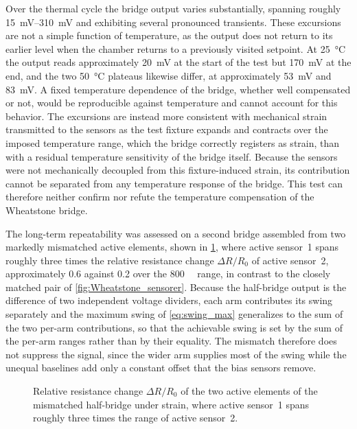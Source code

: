 Over the thermal cycle the bridge output varies substantially, spanning roughly \SIrange{15}{310}{\milli\volt} and exhibiting several pronounced transients. These excursions are not a simple function of temperature, as the output does not return to its earlier level when the chamber returns to a previously visited setpoint. At \SI{25}{\celsius} the output reads approximately \SI{20}{\milli\volt} at the start of the test but \SI{170}{\milli\volt} at the end, and the two \SI{50}{\celsius} plateaus likewise differ, at approximately \SI{53}{\milli\volt} and \SI{83}{\milli\volt}. A fixed temperature dependence of the bridge, whether well compensated or not, would be reproducible against temperature and cannot account for this behavior. The excursions are instead more consistent with mechanical strain transmitted to the sensors as the test fixture expands and contracts over the imposed temperature range, which the bridge correctly registers as strain, than with a residual temperature sensitivity of the bridge itself. Because the sensors were not mechanically decoupled from this fixture-induced strain, its contribution cannot be separated from any temperature response of the bridge. This test can therefore neither confirm nor refute the temperature compensation of the Wheatstone bridge.

The long-term repeatability was assessed on a second bridge assembled from two markedly mismatched active elements, shown in \cref{fig:finalWheatstoneSensorer}, where active sensor~1 spans roughly three times the relative resistance change \(\Delta R/R_0\) of active sensor~2, approximately \num{0.6} against \num{0.2} over the \SI{800}{\micro\strain} range, in contrast to the closely matched pair of \cref{fig:Wheatstone_sensorer}. Because the half-bridge output is the difference of two independent voltage dividers, each arm contributes its swing separately and the maximum swing of \cref{eq:swing_max} generalizes to the sum of the two per-arm contributions, so that the achievable swing is set by the sum of the per-arm ranges rather than by their equality. The mismatch therefore does not suppress the signal, since the wider arm supplies most of the swing while the unequal baselines add only a constant offset that the bias sensors remove.

\begin{figure}[!b]
\centering

    \caption{Relative resistance change \(\Delta R/R_0\) of the two active elements of the mismatched half-bridge under strain, where active sensor~1 spans roughly three times the range of active sensor~2.}
    \label{fig:finalWheatstoneSensorer}
\end{figure}

